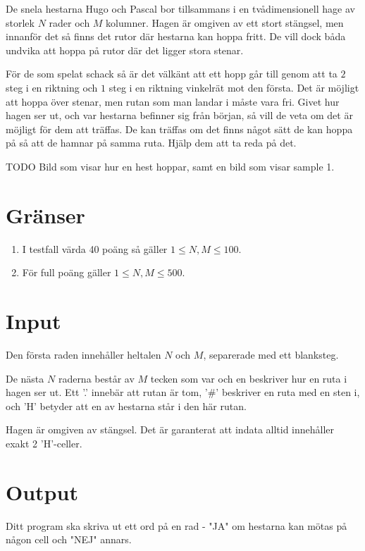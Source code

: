 De snela hestarna Hugo och Pascal bor tillsammans i en tvådimensionell hage av storlek $N$ rader och $M$ kolumner. Hagen är omgiven av ett stort stängsel, men innanför det så finns det rutor där hestarna kan hoppa fritt. De vill dock båda undvika att hoppa på rutor där det ligger stora stenar.

För de som spelat schack så är det välkänt att ett hopp går till genom att ta $2$ steg i en riktning och $1$ steg i en riktning vinkelrät mot den första. Det är möjligt att hoppa över stenar, men rutan som man landar i måste vara fri. Givet hur hagen ser ut, och var hestarna befinner sig från början, så vill de veta om det är möjligt för dem att träffas. De kan träffas om det finns något sätt de kan hoppa på så att de hamnar på samma ruta. Hjälp dem att ta reda på det.

TODO Bild som visar hur en hest hoppar, samt en bild som visar sample 1.

\section*{Gränser}
\begin{enumerate}
\item I testfall värda 40 poäng så gäller $1 \le N,M \le 100$.
\item För full poäng gäller $1 \le N,M \le 500$.
\end{enumerate}

\section*{Input}
Den första raden innehåller heltalen $N$ och $M$, separerade med ett blanksteg.

De nästa $N$ raderna består av $M$ tecken som var och en beskriver hur en ruta i hagen ser ut. Ett '.' innebär att rutan är tom, '\#' beskriver en ruta med en sten i, och 'H' betyder att en av hestarna står i den här rutan.

Hagen är omgiven av stängsel. Det är garanterat att indata alltid innehåller exakt 2 'H'-celler.

\section*{Output}
Ditt program ska skriva ut ett ord på en rad - "JA" om hestarna kan mötas på någon cell och "NEJ" annars.

